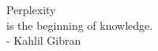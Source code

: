 

\newpage \vspace*{8cm}
\begin{center}
\large Perplexity\\
is the beginning of knowledge.
\vspace{4mm}
\\
- Kahlil Gibran\\
\vspace{2mm}
\autocite[33]{CloudNativ:1}
\end{center}


\newpage